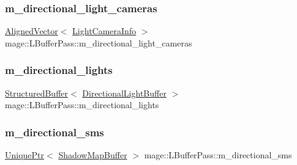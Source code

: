 \hypertarget{structmage_1_1_l_buffer_pass_ab6eead232cc2886b1d29e9f6cc45b16d}{}\label{structmage_1_1_l_buffer_pass_ab6eead232cc2886b1d29e9f6cc45b16d} 
\subsubsection{\texorpdfstring{m\+\_\+directional\+\_\+light\+\_\+cameras}{m\_directional\_light\_cameras}}
{\footnotesize\ttfamily \hyperlink{namespacemage_a8664bfb5ce2179fc64eae9f82c8a5ba8}{Aligned\+Vector}$<$ \hyperlink{structmage_1_1_light_camera_info}{Light\+Camera\+Info} $>$ mage\+::\+L\+Buffer\+Pass\+::m\+\_\+directional\+\_\+light\+\_\+cameras\hspace{0.3cm}{\ttfamily [private]}}

\hypertarget{structmage_1_1_l_buffer_pass_a90327556a34fe3a56e6980accead0c44}{}\label{structmage_1_1_l_buffer_pass_a90327556a34fe3a56e6980accead0c44} 
\subsubsection{\texorpdfstring{m\+\_\+directional\+\_\+lights}{m\_directional\_lights}}
{\footnotesize\ttfamily \hyperlink{classmage_1_1_structured_buffer}{Structured\+Buffer}$<$ \hyperlink{structmage_1_1_directional_light_buffer}{Directional\+Light\+Buffer} $>$ mage\+::\+L\+Buffer\+Pass\+::m\+\_\+directional\+\_\+lights\hspace{0.3cm}{\ttfamily [private]}}

\hypertarget{structmage_1_1_l_buffer_pass_ab1372d2fc5e0e716565f8d3d8eb6db97}{}\label{structmage_1_1_l_buffer_pass_ab1372d2fc5e0e716565f8d3d8eb6db97} 
\subsubsection{\texorpdfstring{m\+\_\+directional\+\_\+sms}{m\_directional\_sms}}
{\footnotesize\ttfamily \hyperlink{namespacemage_a3316d7143a973e37adf1110f2e80ca31}{Unique\+Ptr}$<$ \hyperlink{structmage_1_1_shadow_map_buffer}{Shadow\+Map\+Buffer} $>$ mage\+::\+L\+Buffer\+Pass\+::m\+\_\+directional\+\_\+sms\hspace{0.3cm}{\ttfamily [private]}}

